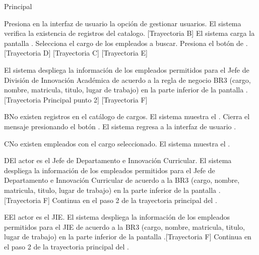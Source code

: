 \begin{UCtrayectoria}{Principal}
    
    \UCpaso[\UCactor] Presiona en la interfaz de usuario  la opción de gestionar usuarios. 
    \UCpaso  El sistema verifica la existencia de registros del catalogo. [Trayectoria B] 
    \UCpaso El sistema carga la pantalla  .
    \UCpaso[\UCactor] Selecciona el cargo de los empleados a buscar. 
    \UCpaso[\UCactor]  Presiona el botón de . [Trayectoria D] [Trayectoria C] [Trayectoria E]
    
    \UCpaso El sistema despliega la información de los empleados permitidos para el Jefe de División de Innovación Académica de acuerdo a la regla de negocio BR3 (cargo, nombre, matricula, titulo, lugar de trabajo) en la parte inferior de la pantalla . [Trayectoria Principal punto 2] [Trayectoria F]
\end{UCtrayectoria}

\begin{UCtrayectoriaA}{B}{No existen registros en el catálogo de cargos.}
    \UCpaso     El sistema muestra el .
    \UCpaso[\UCactor] Cierra el mensaje presionando el botón .
    \UCpaso El sistema regresa a la interfaz de usuario .
\end{UCtrayectoriaA}

\begin{UCtrayectoriaA}{C}{No existen  empleados con el cargo seleccionado.}
    \UCpaso     El sistema muestra el .
\end{UCtrayectoriaA}

\begin{UCtrayectoriaA}{D}{El actor es el Jefe de Departamento e Innovación Curricular.}
 \UCpaso El sistema despliega la información  de los empleados permitidos para el Jefe de Departamento e Innovación Curricular de acuerdo a la BR3 (cargo, nombre, matricula, titulo, lugar de trabajo) en la parte inferior de la pantalla . [Trayectoria F]
  \UCpaso Continua en el paso 2 de la trayectoria principal del .
\end{UCtrayectoriaA}

\begin{UCtrayectoriaA}{E}{El actor es el JIE.}
 \UCpaso El sistema despliega la información  de los empleados permitidos para el JIE de acuerdo a la BR3 (cargo, nombre, matricula, titulo, lugar de trabajo) en la parte inferior de la pantalla .[Trayectoria F]
 \UCpaso Continua en el paso 2 de la trayectoria principal del .
\end{UCtrayectoriaA}

